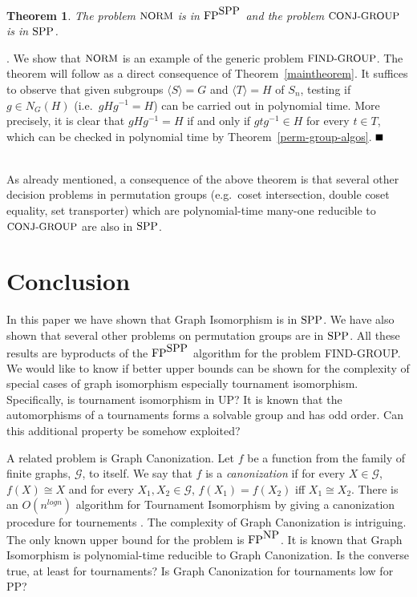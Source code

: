\documentclass{article}
\newtheorem{theorem}{Theorem}[section]
\newcommand{\bproof}{\noindent{\it Proof}}
\newcommand{\eproof}{\hspace*{\fill}$\rule{2mm}{2mm}$~~~~~\bigskip}
\renewenvironment{proof}{\bproof. }{\eproof}
\newcommand{\NP}{\mbox{\rm NP}}
\newcommand{\FP}{\mbox{\rm FP}}
\newcommand{\SPP}{\mbox{\rm SPP}}
\newcommand{\FINDGROUP}{\mbox{\small\rm FIND{-}GROUP}}
\newcommand{\CONJGP}{\mbox{\small\rm CONJ{-}GROUP}}
\newcommand{\NORM}{\mbox{\small\rm NORM}}
\renewcommand{\angle}[1]{\langle #1\rangle}
\begin{document}
\begin{theorem}
  The problem $\NORM$ is in $\FP^{\SPP}$ and the problem $\CONJGP$ is
  in $\SPP$.
\end{theorem}

\begin{proof}
  We show that $\NORM$ is an example of the generic problem
  $\FINDGROUP$. The theorem will follow as a direct consequence of
  Theorem~\ref{maintheorem}. It suffices to observe that given
  subgroups $\angle{S}=G$ and $\angle{T}=H$ of $S_n$, testing if $g\in
  N_G(H)$ (i.e.\ $gHg^{-1}=H$) can be carried out in polynomial time.
  More precisely, it is clear that $gHg^{-1}=H$ if and only if
  $gtg^{-1}\in H$ for every $t\in T$, which can be checked in
  polynomial time by Theorem~\ref{perm-group-algos}.
\end{proof}

As already mentioned, a consequence of the above theorem is that
several other decision problems in permutation groups (e.g.\ coset
intersection, double coset equality, set transporter) which are
polynomial-time many-one reducible to $\CONJGP$ are also in $\SPP$.

\section{Conclusion}

In this paper we have shown that Graph Isomorphism is in $\SPP$. We
have also shown that several other problems on permutation groups are
in $\SPP$. All these results are byproducts of the $\FP^{\SPP}$
algorithm for the problem FIND-GROUP. We would like to know if better
upper bounds can be shown for the complexity of special cases of graph
isomorphism especially tournament isomorphism. Specifically, is
tournament isomorphism in UP? It is known that the automorphisms of a
tournaments forms a solvable group and has odd order. Can this
additional property be somehow exploited?

A related problem is Graph Canonization. Let $f$ be a function from
the family of finite graphs, $\mathcal{G}$, to itself. We say that $f$
is a \emph{canonization} if for every $X \in \mathcal{G}$, $f(X) \cong
X$ and for every $X_1,X_2 \in \mathcal{G}$, $f(X_1) = f(X_2)$ iff $X_1
\cong X_2$. There is an $O(n^{log n})$ algorithm for Tournament
Isomorphism by giving a canonization procedure for tournements
\cite{babai83canonical}. The complexity of Graph Canonization is
intriguing. The only known upper bound for the problem is $\FP^{\NP}$.
It is known that Graph Isomorphism is polynomial-time reducible to
Graph Canonization. Is the converse true, at least for tournaments? Is
Graph Canonization for tournaments low for PP?
\end{document}
